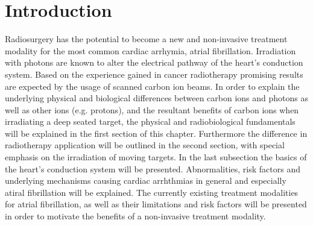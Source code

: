 \documentclass[type=dr, dr=rernat, accentcolor=tud7b,colorbacktitle, bigchapter, openright, twoside, 12pt ]{tudthesis}
\begin{document}
\author{MSc Anna Maria Constantinescu}
\date{\today}
\dateofexam{}{}
\makethesistitle




\dominitoc

\setcounter{tocdepth}{1}
\tableofcontents

\chapter{Introduction}
\minitoc

Radiosurgery has the potential to become a new and non-invasive treatment modality for the most common cardiac arrhymia, atrial fibrillation. 
Irradiation with photons are known to alter the electrical pathway of the heart's conduction system. Based on the 
experience gained in cancer radiotherapy promising results are expected by the usage of scanned carbon ion beams. In order to explain the 
underlying physical and biological differences between carbon ions and photons as well as other ions (e.g. protons), and the resultant benefits 
of carbon ions when irradiating a deep seated target, the physical and radiobiological fundamentals will be explained in the first section of 
this chapter. Furthermore the difference in radiotherapy application will be outlined in the second section, with special emphasis on the 
irradiation of moving targets. In the last subsection the basics of the heart's conduction system will be presented. Abnormalities, risk 
factors and underlying mechanisms causing cardiac arrhthmias in general and especially atiral fibrillation will be explained. The currently 
existing treatment modalities for atrial fibrillation, as well as their limitations and risk factors will be presented in order to motivate 
the benefits of a non-invasive treatment modality. 

\end{document}
